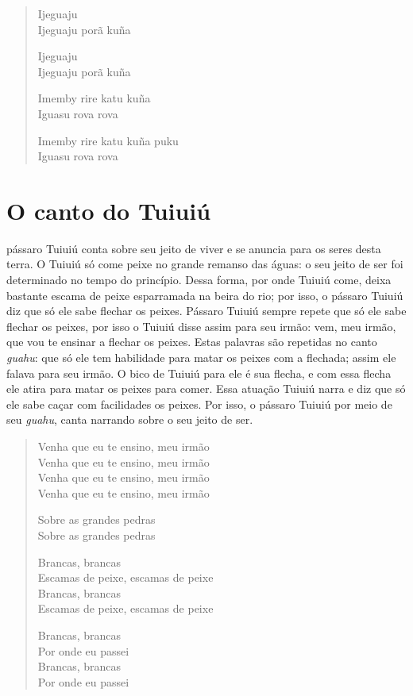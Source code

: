 \begin{verse}
Ijeguaju\\
Ijeguaju porã kuña

Ijeguaju\\
Ijeguaju porã kuña

Imemby rire katu kuña\\ \EP[2]
Iguasu rova rova

Imemby rire katu kuña puku\\
Iguasu rova rova
\end{verse}

\chapter{O canto do Tuiuiú}

 pássaro Tuiuiú conta sobre seu jeito de viver e se anuncia para os
seres desta terra. O Tuiuiú só come peixe no grande remanso das águas: o
seu jeito de ser foi determinado no tempo do princípio. Dessa forma, por
onde Tuiuiú come, deixa bastante escama de peixe esparramada na beira do
rio; por isso, o pássaro Tuiuiú diz que só ele sabe flechar os peixes.
Pássaro Tuiuiú sempre repete que só ele sabe flechar os peixes, por isso
o Tuiuiú disse assim para seu irmão: vem, meu irmão, que vou te ensinar
a flechar os peixes. Estas palavras são repetidas no canto \textit{guahu}:
que só ele tem habilidade para matar os peixes com a flechada; assim ele
falava para seu irmão. O bico de Tuiuiú para ele é sua flecha, e com
essa flecha ele atira para matar os peixes para comer. Essa atuação
Tuiuiú narra e diz que só ele sabe caçar com facilidades os peixes. Por
isso, o pássaro Tuiuiú por meio de seu \textit{guahu}, canta narrando
sobre o seu jeito de ser.

\begin{verse}
Venha que eu te ensino, meu irmão\\
Venha que eu te ensino, meu irmão\\
Venha que eu te ensino, meu irmão\\
Venha que eu te ensino, meu irmão

Sobre as grandes pedras\\
Sobre as grandes pedras

Brancas, brancas\\
Escamas de peixe, escamas de peixe\\
Brancas, brancas\\
Escamas de peixe, escamas de peixe

Brancas, brancas\\
Por onde eu passei\\
Brancas, brancas\\
Por onde eu passei
\end{verse}

